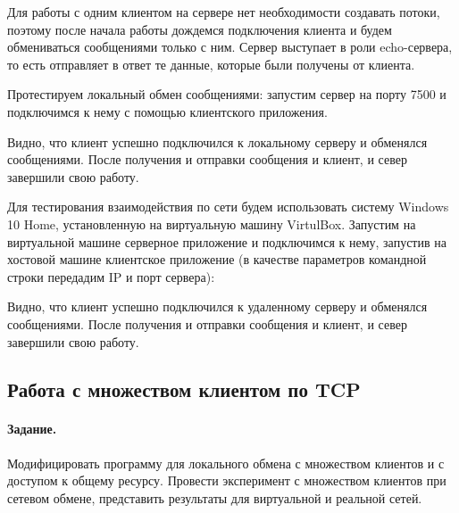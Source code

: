 Для работы с одним клиентом на сервере нет необходимости создавать потоки, поэтому после начала работы дождемся подключения клиента и будем обмениваться сообщениями только с ним. Сервер выступает в роли echo-сервера, то есть отправляет в ответ те данные, которые были получены от клиента.





Протестируем локальный обмен сообщениями: запустим сервер на порту 7500 и подключимся к нему с помощью клиентского приложения.





Видно, что клиент успешно подключился к локальному серверу и обменялся сообщениями. После получения и отправки сообщения  и клиент, и север завершили свою работу.

Для тестирования взаимодействия по сети будем использовать систему Windows 10 Home, установленную на виртуальную машину VirtulBox. Запустим на виртуальной машине серверное приложение и подключимся к нему, запустив на хостовой машине клиентское приложение (в качестве параметров командной строки передадим IP и порт сервера):





Видно, что клиент успешно подключился к удаленному серверу и обменялся сообщениями. После получения и отправки сообщения  и клиент, и север завершили свою работу.

\subsection{Работа с множеством клиентом по TCP}

\paragraph{Задание.} Модифицировать программу для локального обмена с множеством клиентов и с доступом к общему ресурсу. Провести эксперимент с множеством клиентов при сетевом обмене, представить результаты для виртуальной и реальной сетей.

